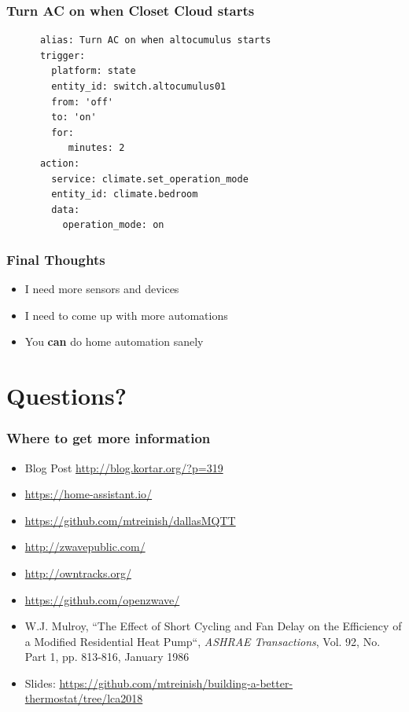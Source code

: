 \documentclass[aspectratio=169,11pt,hyperref={colorlinks=true}]{beamer}
\begin{document}
\begin{frame}[fragile=singleslide]
    \frametitle{Turn AC on when Closet Cloud starts}
    \begin{verbatim}
      alias: Turn AC on when altocumulus starts
      trigger:
        platform: state
        entity_id: switch.altocumulus01
        from: 'off'
        to: 'on'
        for:
           minutes: 2
      action:
        service: climate.set_operation_mode
        entity_id: climate.bedroom
        data:
          operation_mode: on
    \end{verbatim}
\end{frame}

\begin{frame}
    \frametitle{Final Thoughts}
    \begin{itemize}
        \item I need more sensors and devices
        \item I need to come up with more automations
        \item You \textbf{can} do home automation sanely
    \end{itemize}
\end{frame}

\section{Questions?}
\begin{frame}
\frametitle{Where to get more information}
    \begin{itemize}
        \item Blog Post \href{http://blog.kortar.org/?p=319}{http://blog.kortar.org/?p=319}
        \item \href{https://home-assistant.io/}{https://home-assistant.io/}
        \item \href{https://github.com/mtreinish/dallasMQTT}{https://github.com/mtreinish/dallasMQTT}
        \item \href{http://zwavepublic.com/}{http://zwavepublic.com/}
        \item \href{http://owntracks.org/}{http://owntracks.org/}
        \item \href{https://github.com/openzwave/}{https://github.com/openzwave/}
        \item W.J. Mulroy, ``The Effect of Short Cycling and Fan Delay on the Efficiency of a Modified Residential Heat Pump``, \textit{ASHRAE Transactions}, Vol. 92, No. Part 1, pp. 813-816, January 1986
        \item Slides: \href{https://github.com/mtreinish/building-a-better-thermostat/tree/lca2018}{https://github.com/mtreinish/building-a-better-thermostat/tree/lca2018}
    \end{itemize}
\end{frame}
\end{document}
